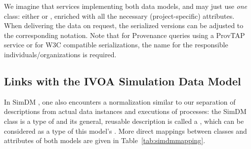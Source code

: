 We imagine that services implementing both data models,  and  may just use \emph{one} class: either  or , enriched with all the necessary (project-specific) attributes. When delivering the data on request, the serialized versions can be adjusted to the corresponding notation.
Note that for Provenance queries using a ProvTAP service or for W3C compatible serializations, the name  for the responsible individuals/organizations is required.




\subsection{Links with the IVOA Simulation Data Model}

In SimDM \citep{std:SimDM}, one also encounters a normalization similar to our separation of descriptions from 
actual data instances and executions of processes: the SimDM class 
is a type of  and its general, reusable description is called a ,
which can be considered as a type of this model's . 
More direct mappings between classes and attributes of both models are given in Table~\ref{tab:simdmmapping}.

